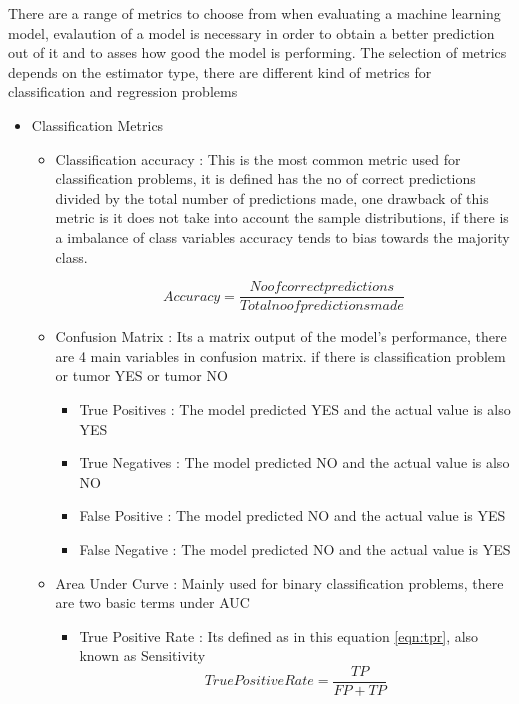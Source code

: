 There are a range of metrics to choose from when evaluating a machine learning model, evalaution of a model is necessary in order to obtain a better prediction out of it and to asses how good the model is performing. The selection of metrics depends on the estimator type, there are different kind of metrics for classification and regression problems
\begin{itemize}
    \item Classification Metrics
    \begin{itemize}
        \item Classification accuracy : This is the most common metric used for classification problems, it is defined has the no of correct predictions divided by the total number of predictions made, one drawback of this metric is it does not take into account the sample distributions, if there is a imbalance of class variables accuracy tends to bias towards the majority class.
        
        \begin{equation}
            \displaystyle{Accuracy} = \frac{\displaystyle{No of correct predictions}}{Total no of predictions made}
        \end{equation}
        
        \item Confusion Matrix : Its a matrix output of the model's performance, there are 4 main variables in confusion matrix. if there is classification problem or tumor YES or tumor NO
        \begin{itemize}
            \item True Positives : The model predicted YES and the actual value is also YES
            
            \item True Negatives : The model predicted NO and the actual value is also NO
            
            \item False Positive : The model predicted NO and the actual value is YES
            
            \item False Negative : The model predicted NO and the actual value is YES
        \end{itemize}
        
        \item Area Under Curve : Mainly used for binary classification problems, there are two basic terms under AUC 
        \begin{itemize}
            \item True Positive Rate : Its defined as in this equation \ref{eqn:tpr}, also known as Sensitivity 
            \begin{equation}
                \displaystyle{True Positive Rate} = \frac{\displaystyle{TP}}{\displaystyle{FP + TP}}
                \label{eqn:tpr}
            \end{equation}
            

\end{itemize}
\end{itemize}
\end{itemize}
